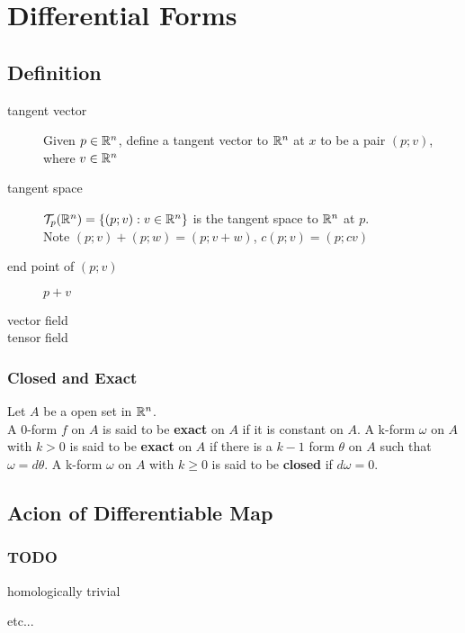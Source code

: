 \section{Differential Forms}
\subsection{Definition}
\begin{description}
\item[tangent vector] Given $p\in{\mathbb R}^n$, define a tangent vector
to ${\mathbb R}^n$ at $x$ to be a pair $(p; v)$, where $v\in{\mathbb R}^n$
\item[tangent space] ${\mathcal T}_p({\mathbb R}^n)=\{(p;v):v\in{\mathbb R}^n\}$
is the tangent space to ${\mathbb R}^n$ at $p$.
\\
Note $(p;v)+(p;w)=(p;v+w)$, $c(p;v)=(p;cv)$
\item[end point of $(p; v)$] \extranote{[in Spivak]} $p+v$
\item[vector field] \extranote{[in Spivak]} \TODO
\item[tensor field]
\end{description}
\subsubsection{Closed and Exact}
Let $A$ be a open set in ${\mathbb R}^n$.\\
A 0-form $f$ on $A$ is said to be \textbf{exact} on $A$ if it is constant on $A$.
A k-form $\omega$ on $A$ with $k>0$ is said to be \textbf{exact} on $A$
if there is a $k-1$ form $\theta$ on $A$ such that $\omega = d\theta$.
A k-form $\omega$ on $A$ with $k\geq 0$ is said to be \textbf{closed} if $d\omega=0$.

\subsection{Acion of Differentiable Map}

\subsubsection{TODO}
homologically trivial

etc...

